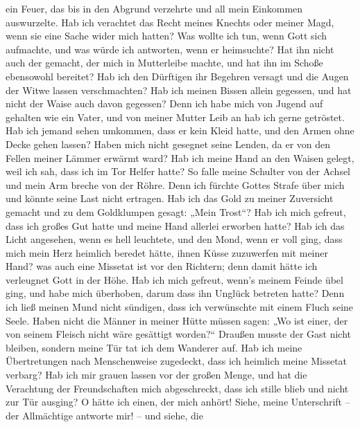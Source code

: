 ein Feuer, das bis in den Abgrund verzehrte und all mein Einkommen
auswurzelte.  Hab ich verachtet das Recht meines Knechts
oder meiner Magd, wenn sie eine Sache wider mich hatten? 
Was wollte ich tun, wenn Gott sich aufmachte, und was würde ich
antworten, wenn er heimsuchte?  Hat ihn nicht auch der
gemacht, der mich in Mutterleibe machte, und hat ihn im Schoße
ebensowohl bereitet?  Hab ich den Dürftigen ihr Begehren
versagt und die Augen der Witwe lassen verschmachten?  Hab
ich meinen Bissen allein gegessen, und hat nicht der Waise auch davon
gegessen?  Denn ich habe mich von Jugend auf gehalten wie
ein Vater, und von meiner Mutter Leib an hab ich gerne getröstet.
 Hab ich jemand sehen umkommen, dass er kein Kleid hatte,
und den Armen ohne Decke gehen lassen?  Haben mich nicht
gesegnet seine Lenden, da er von den Fellen meiner Lämmer erwärmt ward?
 Hab ich meine Hand an den Waisen gelegt, weil ich sah,
dass ich im Tor Helfer hatte?  So falle meine Schulter von
der Achsel und mein Arm breche von der Röhre.  Denn ich
fürchte Gottes Strafe über mich und könnte seine Last nicht ertragen.
 Hab ich das Gold zu meiner Zuversicht gemacht und zu dem
Goldklumpen gesagt: „Mein Trost``?  Hab ich mich gefreut,
dass ich großes Gut hatte und meine Hand allerlei erworben hatte?
 Hab ich das Licht angesehen, wenn es hell leuchtete, und
den Mond, wenn er voll ging,  dass mich mein Herz heimlich
beredet hätte, ihnen Küsse zuzuwerfen mit meiner Hand?  was
auch eine Missetat ist vor den Richtern; denn damit hätte ich verleugnet
Gott in der Höhe.  Hab ich mich gefreut, wenn's meinem
Feinde übel ging, und habe mich überhoben, darum dass ihn Unglück
betreten hatte?  Denn ich ließ meinen Mund nicht sündigen,
dass ich verwünschte mit einem Fluch seine Seele.  Haben
nicht die Männer in meiner Hütte müssen sagen: „Wo ist einer, der von
seinem Fleisch nicht wäre gesättigt worden?{}``  Draußen
musste der Gast nicht bleiben, sondern meine Tür tat ich dem Wanderer
auf.  Hab ich meine Übertretungen nach Menschenweise
zugedeckt, dass ich heimlich meine Missetat verbarg?  Hab
ich mir grauen lassen vor der großen Menge, und hat die Verachtung der
Freundschaften mich abgeschreckt, dass ich stille blieb und nicht zur
Tür ausging?  O hätte ich einen, der mich anhört! Siehe,
meine Unterschrift -- der Allmächtige antworte mir! -- und siehe, die
